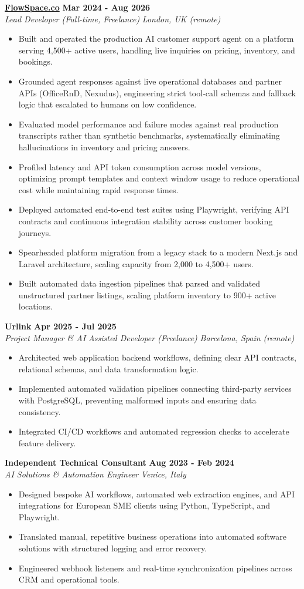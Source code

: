 \documentclass[10pt,a4paper]{article}
\newcommand{\role}[4]{%
  \textbf{#1} \hfill \textbf{#2}\\[1pt]%
  \textit{#3} \hfill \textit{#4}\\[2pt]%
}
\begin{document}
\role{\href{https://flowspace.co}{FlowSpace.co}}{Mar 2024 - Aug 2026}{Lead Developer (Full-time, Freelance)}{London, UK (remote)}
\begin{itemize}
  \item Built and operated the production AI customer support agent on a platform serving 4,500+ active users, handling live inquiries on pricing, inventory, and bookings.
  \item Grounded agent responses against live operational databases and partner APIs (OfficeRnD, Nexudus), engineering strict tool-call schemas and fallback logic that escalated to humans on low confidence.
  \item Evaluated model performance and failure modes against real production transcripts rather than synthetic benchmarks, systematically eliminating hallucinations in inventory and pricing answers.
  \item Profiled latency and API token consumption across model versions, optimizing prompt templates and context window usage to reduce operational cost while maintaining rapid response times.
  \item Deployed automated end-to-end test suites using Playwright, verifying API contracts and continuous integration stability across customer booking journeys.
  \item Spearheaded platform migration from a legacy stack to a modern Next.js and Laravel architecture, scaling capacity from 2,000 to 4,500+ users.
  \item Built automated data ingestion pipelines that parsed and validated unstructured partner listings, scaling platform inventory to 900+ active locations.
\end{itemize}

\role{Urlink}{Apr 2025 - Jul 2025}{Project Manager \& AI Assisted Developer (Freelance)}{Barcelona, Spain (remote)}
\begin{itemize}
  \item Architected web application backend workflows, defining clear API contracts, relational schemas, and data transformation logic.
  \item Implemented automated validation pipelines connecting third-party services with PostgreSQL, preventing malformed inputs and ensuring data consistency.
  \item Integrated CI/CD workflows and automated regression checks to accelerate feature delivery.
\end{itemize}

\role{Independent Technical Consultant}{Aug 2023 - Feb 2024}{AI Solutions \& Automation Engineer}{Venice, Italy}
\begin{itemize}
  \item Designed bespoke AI workflows, automated web extraction engines, and API integrations for European SME clients using Python, TypeScript, and Playwright.
  \item Translated manual, repetitive business operations into automated software solutions with structured logging and error recovery.
  \item Engineered webhook listeners and real-time synchronization pipelines across CRM and operational tools.
\end{itemize}
\end{document}
